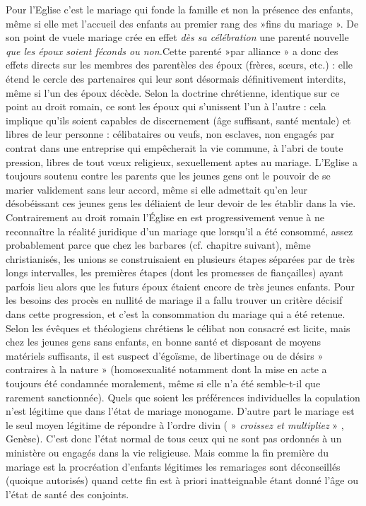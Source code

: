  Pour l'Eglise c'est le mariage qui fonde la famille et non la présence des enfants, même si elle met l'accueil des enfants au premier rang des »fins du mariage ». De son point de vue\emph{}le mariage crée en effet \emph{dès sa célébration} une parenté nouvelle\emph{ que les époux soient féconds ou non.}Cette parenté »par alliance » a donc des effets directs sur les membres des parentèles des époux (frères, sœurs, etc.) : elle étend le cercle des partenaires qui leur sont désormais définitivement interdits, même si l'un des époux décède.
 Selon la doctrine chrétienne, identique sur ce point au droit romain, ce sont les époux qui s'unissent l'un à l'autre : cela implique qu'ils soient capables de discernement (âge suffisant, santé mentale) et libres de leur personne : célibataires ou veufs, non esclaves, non engagés par contrat dans une entreprise qui empêcherait la vie commune, à l'abri de toute pression, libres de tout vœux religieux, sexuellement aptes au mariage. L'Eglise a toujours soutenu contre les parents que les jeunes gens ont le pouvoir de se marier validement sans leur accord, même si elle admettait qu'en leur désobéissant ces jeunes gens les déliaient de leur devoir de les établir dans la vie. 
 Contrairement au droit romain l'Église en est progressivement venue à ne reconnaître la réalité juridique d'un mariage que lorsqu'il a été consommé, assez probablement parce que chez les barbares (cf. chapitre suivant), même christianisés, les unions se construisaient en plusieurs étapes séparées par de très longs intervalles, les premières étapes (dont les promesses de fiançailles) ayant parfois lieu alors que les futurs époux étaient encore de très jeunes enfants. Pour les besoins des procès en nullité de mariage il a fallu trouver un critère décisif dans cette progression, et c'est la consommation du mariage qui a été retenue. 
 Selon les évêques et théologiens chrétiens le célibat non consacré est licite, mais chez les jeunes gens sans enfants, en bonne santé et disposant de moyens matériels suffisants, il est suspect d'égoïsme, de libertinage ou de désirs » contraires à la nature » (homosexualité notamment dont la mise en acte a toujours été condamnée moralement, même si elle n'a été semble-t-il que rarement sanctionnée). Quels que soient les préférences individuelles la copulation n'est légitime que dans l'état de mariage monogame. D'autre part le mariage est le seul moyen légitime de répondre à l'ordre divin ( » \emph{croissez et multipliez} » , Genèse). C'est donc l'état normal de tous ceux qui ne sont pas ordonnés à un ministère ou engagés dans la vie religieuse. Mais comme la fin première du mariage est la procréation d'enfants légitimes les remariages sont déconseillés (quoique autorisés) quand cette fin est à priori inatteignable étant donné l'âge ou l'état de santé des conjoints. 
